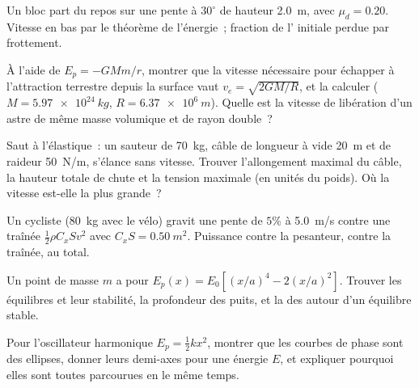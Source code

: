 \begin{exercise}[$\star\star$]\label{exo:b1:work-and-energy:5}
Un bloc part du repos sur une pente à $30^\circ$ de hauteur \qty{2.0}{m},
avec $\mu_d = 0.20$. Vitesse en bas par le théorème de l'énergie~;
fraction de l' initiale perdue par frottement.
\end{exercise}

\begin{exercise}[$\star\star$]\label{exo:b1:work-and-energy:6}
À l'aide de $E_p = -GMm/r$, montrer que la vitesse nécessaire pour
échapper à l'attraction terrestre depuis la surface vaut
$v_e = \sqrt{2GM/R}$, et la calculer ($M = \qty{5.97e24}{kg}$,
$R = \qty{6.37e6}{m}$). Quelle est la vitesse de libération d'un astre de
même masse volumique et de rayon double~?
\end{exercise}

\begin{exercise}[$\star\star$]\label{exo:b1:work-and-energy:7}
Saut à l'élastique~: un sauteur de \qty{70}{kg}, câble de longueur à
vide \qty{20}{m} et de raideur \qty{50}{N/m}, s'élance sans vitesse.
Trouver l'allongement maximal du câble, la hauteur totale de chute et la
tension maximale (en unités du poids). Où la vitesse est-elle la plus
grande~?
\end{exercise}

\begin{exercise}[$\star\star$]\label{exo:b1:work-and-energy:8}
Un cycliste (\qty{80}{kg} avec le vélo) gravit une pente de $5\%$ à
\qty{5.0}{m/s} contre une traînée $\tfrac12\rho C_xSv^2$ avec
$C_xS = \qty{0.50}{m^2}$. Puissance contre la pesanteur, contre la
traînée, au total.
\end{exercise}

\begin{exercise}[$\star\star$]\label{exo:b1:work-and-energy:9}
Un point de masse $m$ a pour 
$E_p(x) = E_0[(x/a)^4 - 2(x/a)^2]$. Trouver les équilibres et leur
stabilité, la profondeur des puits, et la  des  autour d'un équilibre stable.
\end{exercise}

\begin{exercise}[$\star\star\star$]\label{exo:b1:work-and-energy:10}
Pour l'oscillateur harmonique $E_p = \tfrac12 kx^2$, montrer que les
courbes de phase sont des ellipses, donner leurs demi-axes pour une
énergie $E$, et expliquer pourquoi elles sont toutes parcourues en le
même temps.
\end{exercise}

